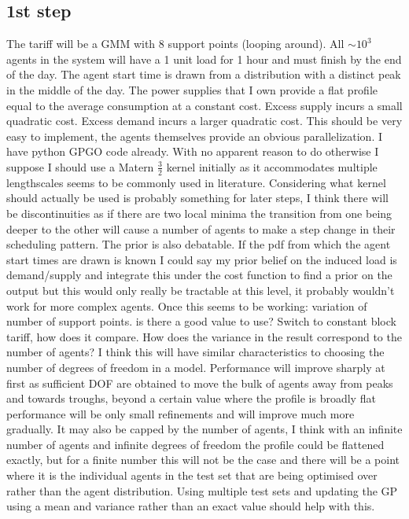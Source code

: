 \documentclass[11pt]{article}
\begin{document}
\subsection{1st step}
The tariff will be a GMM with 8 support points (looping around). All $\sim 10^{3}$
agents in the system will have a 1 unit load for 1 hour and must finish by
the end of the day. The agent start time is drawn from a distribution with a
distinct peak in the middle of the day. The power supplies that I own provide a
flat profile equal to the average consumption at a constant cost. Excess supply
incurs a small quadratic cost. Excess demand incurs a larger quadratic cost.
This should be very easy to implement, the agents themselves provide an
obvious parallelization. I have python GPGO code already. With no apparent
reason to do otherwise I suppose I should use a Matern $ \frac{3}{2} $ kernel initially as it accommodates multiple lengthscales seems to be commonly used in literature. Considering what kernel should actually be used is probably something for later steps, I think there will be discontinuities as if there are two local minima the transition from one being deeper to the other will cause a number of agents to make a step change in their scheduling pattern. The prior is also debatable. If the pdf from which the agent start times are drawn is known
I could say my prior belief on the induced load is demand/supply and integrate
this under the cost function to find a prior on the output but this would only
really be tractable at this level, it probably wouldn't work for more complex
agents.
Once this seems to be working: variation of number of support points. is
there a good value to use? Switch to constant block tariff, how does it compare.
How does the variance in the result correspond to the number of agents? I think this will have similar characteristics to choosing the number of degrees of freedom in a model. Performance will improve sharply at first as sufficient DOF are obtained to move the bulk of agents away from peaks and towards troughs, beyond a certain value where the profile is broadly flat performance will be only small refinements and will improve much more gradually. It may also be capped by the number of agents, I think with an infinite number of agents and infinite degrees of freedom the profile could be flattened exactly, but for a finite number this will not be the case and there will be a point where it is the individual agents in the test set that are being optimised over rather than the agent distribution. Using multiple test sets and updating the GP using a mean and variance rather than an exact value should help with this.
\end{document}
